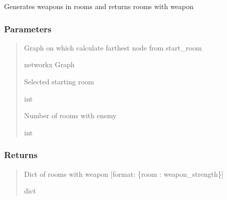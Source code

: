 \documentclass[letterpaper,10pt,english]{sphinxmanual}
\begin{document}

\begin{fulllineitems}
\label{\detokenize{api_reference/dungeon_resolver/generate_dungeon_problem:generate_dungeon_problem.generate_weapons}}
\pysigstartsignatures
{}
\pysigstopsignatures
\sphinxAtStartPar
Generates weapons in rooms and returns rooms with weapon


\subsubsection{Parameters}
\label{\detokenize{api_reference/dungeon_resolver/generate_dungeon_problem:id13}}\begin{quote}\begin{description}
\sphinxAtStartPar
Graph on which calculate farthest node from start\_room

\sphinxAtStartPar
networkx Graph

\sphinxAtStartPar
Selected starting room

\sphinxAtStartPar
int

\sphinxAtStartPar
Number of rooms with enemy

\sphinxAtStartPar
int

\end{description}\end{quote}


\subsubsection{Returns}
\label{\detokenize{api_reference/dungeon_resolver/generate_dungeon_problem:id14}}\begin{quote}\begin{description}
\sphinxAtStartPar
Dict of rooms with weapon {[}format: \{room : weapon\_strength\}{]}

\sphinxAtStartPar
dict

\end{description}\end{quote}

\end{fulllineitems}
\end{document}
